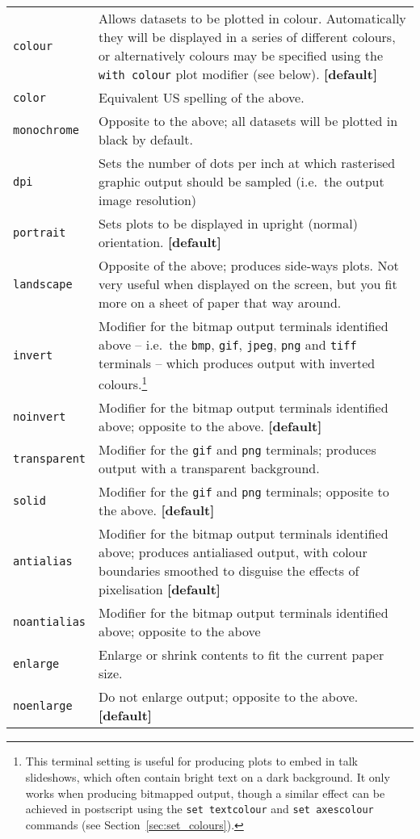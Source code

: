 \begin{longtable}{p{3cm}p{9cm}}
{\tt colour} & Allows datasets to be plotted in colour. Automatically they will be displayed in a series of different colours, or alternatively colours may be specified using the {\tt with colour} plot modifier (see below). {\bf [default]}\index{colour output}\\
{\tt color} & Equivalent US spelling of the above. \\
{\tt monochrome} & Opposite to the above; all datasets will be plotted in black by default.\index{monochrome output}\\
{\tt dpi} & Sets the number of dots per inch at which rasterised graphic output should be sampled (i.e.\ the output image resolution)\\
{\tt portrait} & Sets plots to be displayed in upright (normal) orientation. {\bf [default]}\index{portrait orientation}\\
{\tt landscape} & Opposite of the above; produces side-ways plots. Not very useful when displayed on the screen, but you fit more on a sheet of paper that way around.\index{landscape orientation}\\
{\tt invert} & Modifier for the bitmap output terminals identified above -- i.e.\ the {\tt bmp}, {\tt gif}, {\tt jpeg}, {\tt png} and {\tt tiff} terminals -- which produces output with inverted colours.\footnote{This terminal setting is useful for producing plots to embed in talk slideshows, which often contain bright text on a dark background. It only works when producing bitmapped output, though a similar effect can be achieved in postscript using the {\tt set textcolour} and {\tt set axescolour} commands (see Section~\ref{sec:set_colours}).}\index{colours!inverting}\\
{\tt noinvert} & Modifier for the bitmap output terminals identified above; opposite to the above. {\bf [default]}\\
{\tt transparent} & Modifier for the {\tt gif} and {\tt png} terminals; produces output with a transparent background.\index{transparent terminal}\index{gif output!transparency}\index{png output!transparency}\\
{\tt solid} & Modifier for the {\tt gif} and {\tt png} terminals; opposite to the above. {\bf [default]}\\
{\tt antialias} & Modifier for the bitmap output terminals identified above; produces antialiased output, with colour boundaries smoothed to disguise the effects of pixelisation {\bf [default]}\\
{\tt noantialias} & Modifier for the bitmap output terminals identified above; opposite to the above\\
{\tt enlarge} & Enlarge or shrink contents to fit the current paper size.\index{enlarging output}\\
{\tt noenlarge} & Do not enlarge output; opposite to the above. {\bf [default]}\\
\end{longtable}

